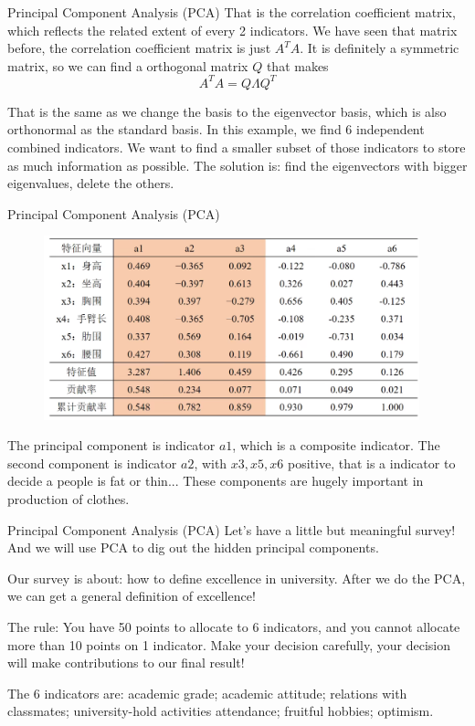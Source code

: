 \documentclass{beamer}
\begin{document}
\begin{frame}{Principal Component Analysis (PCA)}
That is the correlation coefficient matrix, which reflects the related extent of every 2 indicators. We have seen that matrix before, the correlation coefficient matrix is just $A^TA$. It is definitely a symmetric matrix, so we can find a orthogonal matrix $Q$ that makes
\begin{equation*}
    A^TA=Q\varLambda Q^{T}
\end{equation*}

That is the same as we change the basis to the eigenvector basis, which is also orthonormal as the standard basis. In this example, we find 6 independent combined indicators. We want to find a smaller subset of those indicators to store as much information as possible. The solution is: find the eigenvectors with bigger eigenvalues, delete the others.

\end{frame}

\begin{frame}{Principal Component Analysis (PCA)}
\begin{figure}
    \includegraphics[width=0.97\textwidth]{eig.png}
\end{figure}

The principal component is indicator $a1$, which is a composite indicator. The second component is indicator $a2$, with $x3, x5, x6$ positive, that is a indicator to decide a people is fat or thin... These components are hugely important in production of clothes.
\end{frame}

\begin{frame}{Principal Component Analysis (PCA)}
Let's have a little but meaningful survey! And we will use PCA to dig out the hidden principal components.

\vspace{3pt}
Our survey is about: how to define excellence in university. After we do the PCA, we can get a general definition of excellence!

\vspace{3pt}
The rule: You have 50 points to allocate to 6 indicators, and you cannot allocate more than 10 points on 1 indicator. Make your decision carefully, your decision will make contributions to our final result!

\vspace{3pt}
The 6 indicators are: academic grade; academic attitude; relations with classmates; university-hold activities attendance; fruitful hobbies; optimism.
\end{frame}
\end{document}
